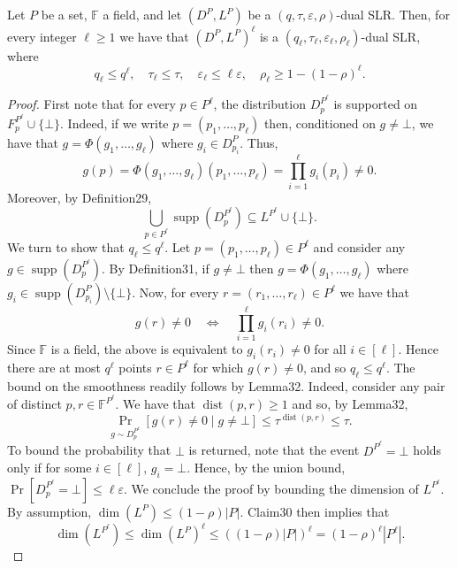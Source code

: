 \begin{ntproposition}
Let $P$ be a set, $\mathbb F$ a field, and let $(D^P,L^P)$ be a $(q,\tau,\varepsilon,\rho)$-dual SLR. Then, for every integer $\ell\geq1$ we have that $(D^P,L^P)^\ell$ is a $(q_\ell,\tau_\ell,\varepsilon_\ell,\rho_\ell)$-dual SLR, where
\[q_\ell\leq q^\ell,\quad\tau_\ell\leq\tau,\quad\varepsilon_\ell\leq\ell\varepsilon,\quad\rho_\ell\geq1-(1-\rho)^\ell.\]
\end{ntproposition}
\begin{proof}
First note that for every $p\in P^\ell$, the distribution $D_p^{P^\ell}$ is supported on $F_p^{P^\ell}\cup\{\bot\}$. Indeed, if we write $p=(p_1,\ldots,p_\ell)$ then, conditioned on $g\ne\bot$, we have that $g=\Phi(g_1,\ldots,g_\ell)$ where $g_i\in D_{p_i}^P$. Thus,
\[g(p)=\Phi(g_1,\ldots,g_\ell)(p_1,\ldots,p_\ell)=\prod_{i=1}^\ell g_i(p_i)\ne0.\]
Moreover, by Definition29,
\[\bigcup_{p\in P^\ell}\operatorname{supp}(D_p^{P^\ell})\subseteq L^{P^\ell}\cup\{\bot\}.\]
We turn to show that $q_\ell\leq q^\ell$. Let $p=(p_1,\ldots,p_\ell)\in P^\ell$ and consider any $g\in\operatorname{supp}(D_p^{P^\ell})$. By Definition31, if $g\ne\bot$ then $g=\Phi(g_1,\ldots,g_\ell)$ where $g_i\in\operatorname{supp}(D_{p_i}^P)\setminus\{\bot\}$. Now, for every $r=(r_1,\ldots,r_\ell)\in P^\ell$ we have that
\[g(r)\ne0\quad\Longleftrightarrow\quad\prod_{i=1}^\ell g_i(r_i)\ne0.\]
Since $\mathbb F$ is a field, the above is equivalent to $g_i(r_i)\ne0$ for all $i\in[\ell]$. Hence there are at most $q^\ell$ points $r\in P^\ell$ for which $g(r)\ne0$, and so $q_\ell\leq q^\ell$.
The bound on the smoothness readily follows by Lemma32. Indeed, consider any pair of distinct $p,r\in\mathbb F^{P^\ell}$. We have that $\operatorname{dist}(p,r)\geq1$ and so, by Lemma32,
\begin{equation}\Pr_{g\sim D_p^{P^\ell}}[g(r)\ne0\mid g\ne\bot]\leq\tau^{\operatorname{dist}(p,r)}\leq\tau.\tag{4.2}\end{equation}
To bound the probability that $\bot$ is returned, note that the event $D^{P^\ell}=\bot$ holds only if for some $i\in[\ell]$, $g_i=\bot$. Hence, by the union bound, $\Pr[D_p^{P^\ell}=\bot]\leq\ell\varepsilon$. We conclude the proof by bounding the dimension of $L^{P^\ell}$. By assumption, $\dim(L^P)\leq(1-\rho)|P|$. Claim30 then implies that
\[\dim(L^{P^\ell})\leq\dim(L^P)^\ell\leq((1-\rho)|P|)^\ell=(1-\rho)^\ell|P^\ell|.\]
\end{proof}
